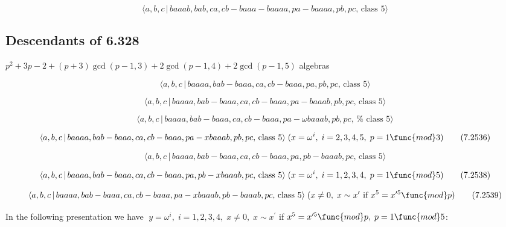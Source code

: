 \documentclass[10pt]{article}
\begin{document}
\begin{equation}
\langle a,b,c\,|\,baaab,bab,ca,cb-baaa-baaaa,pa-baaaa,pb,pc,\,\text{class }%
5\rangle  \tag{7.2532}
\end{equation}

\subsection{Descendants of 6.328}

$p^{2}+3p-2+(p+3)\gcd (p-1,3)+2\gcd (p-1,4)+2\gcd (p-1,5)$ algebras

\begin{equation}
\langle a,b,c\,|\,baaaa,bab-baaa,ca,cb-baaa,pa,pb,pc,\,\text{class }5\rangle
\tag{7.2533}
\end{equation}

\begin{equation}
\langle a,b,c\,|\,baaaa,bab-baaa,ca,cb-baaa,pa-baaab,pb,pc,\,\text{class }%
5\rangle  \tag{7.2534}
\end{equation}

\begin{equation}
\langle a,b,c\,|\,baaaa,bab-baaa,ca,cb-baaa,pa-\omega baaab,pb,pc,\,\text{%
class }5\rangle  \tag{7.2535}
\end{equation}

\begin{equation}
\langle a,b,c\,|\,baaaa,bab-baaa,ca,cb-baaa,pa-xbaaab,pb,pc,\,\text{class }%
5\rangle \;(x=\omega ^{i},\;i=2,3,4,5,\;p=1\func{mod}3)  \tag{7.2536}
\end{equation}

\begin{equation}
\langle a,b,c\,|\,baaaa,bab-baaa,ca,cb-baaa,pa,pb-baaab,pc,\,\text{class }%
5\rangle  \tag{7.2537}
\end{equation}

\begin{equation}
\langle a,b,c\,|\,baaaa,bab-baaa,ca,cb-baaa,pa,pb-xbaaab,pc,\,\text{class }%
5\rangle \;(x=\omega ^{i},\;i=1,2,3,4,\;p=1\func{mod}5)  \tag{7.2538}
\end{equation}

\begin{equation}
\langle a,b,c\,|\,baaaa,bab-baaa,ca,cb-baaa,pa-xbaaab,pb-baaab,pc,\,\text{%
class }5\rangle \;(x\neq 0,\;x\sim x^{\prime }\text{ if }x^{5}=x^{\prime 5}%
\func{mod}p)  \tag{7.2539}
\end{equation}

In the following presentation we have $\;y=\omega ^{i},\;i=1,2,3,4,\;x\neq
0,\;x\sim x^{\prime }$ if $x^{5}=x^{\prime 5}\func{mod}p,\;p=1\func{mod}5$:
\end{document}
